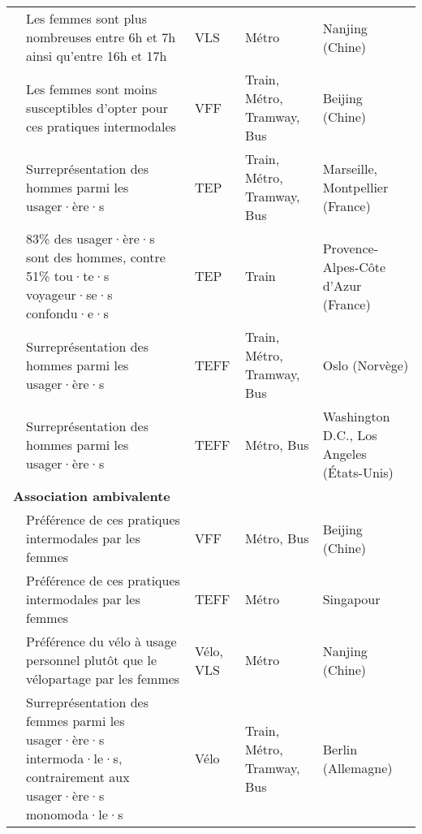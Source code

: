 \begin{longtable}{p{3cm}p{4cm}p{1.5cm}p{1.8cm}p{2.3cm}}
    \small{\textcite{ma_understanding_2018}}\index{Ma, Xinwei|pagebf} & \small{Les femmes sont plus nombreuses entre 6h et 7h ainsi qu'entre 16h et 17h} & \small{VLS} & \small{Métro} & \small{Nanjing (Chine)}\\
    \small{\textcite{fan_how_2019}}\index{Fan, Aihua|pagebf} & \small{Les femmes sont moins susceptibles d'opter pour ces pratiques intermodales} & \small{VFF} & \small{Train, Métro, Tramway, Bus} & \small{Beijing (Chine)}\\
    \small{\textcite{pages_les_2021}}\index{Pages, Thibaud|pagebf} & \small{Surreprésentation des hommes parmi les usager·ère·s} & \small{TEP} & \small{Train, Métro, Tramway, Bus} & \small{Marseille, Montpellier (France)}\\
    \small{\textcite{moinse_intermodal_2022}}\index{Moinse, Dylan|pagebf} & \small{83\% des usager·ère·s sont des hommes, contre 51\% tou·te·s voyageur·se·s confondu·e·s} & \small{TEP} & \small{Train} & \small{Provence-Alpes-Côte d'Azur (France)}\\
    \small{\textcite{fearnley_patterns_2020}}\index{Fearnley, Nils|pagebf} & \small{Surreprésentation des hommes parmi les usager·ère·s} & \small{TEFF} & \small{Train, Métro, Tramway, Bus} & \small{Oslo (Norvège)}\\
    \small{\textcite{yan_evaluating_2023}}\index{Yan, Xiang|pagebf} & \small{Surreprésentation des hommes parmi les usager·ère·s} & \small{TEFF} & \small{Métro, Bus} & \small{Washington D.C., Los Angeles (États-Unis)}\\
    \hline
\multicolumn{5}{l}{\textbf{Association ambivalente}}\\
    \small{\textcite{guo_exploring_2023}}\index{Guo, Dongbo|pagebf} & \small{Préférence de ces pratiques intermodales par les femmes} & \small{VFF} & \small{Métro, Bus} & \small{Beijing (Chine)}\\
    \small{\textcite{cao_e-scooter_2021}}\index{Cao, Zhejing|pagebf} & \small{Préférence de ces pratiques intermodales par les femmes} & \small{TEFF} & \small{Métro} & \small{Singapour}\\
    \small{\textcite{ji_public_2017}}\index{Ji, Yanjie|pagebf} & \small{Préférence du vélo à usage personnel plutôt que le vélopartage par les femmes} & \small{Vélo, VLS} & \small{Métro} & \small{Nanjing (Chine)}\\
    \small{\textcite{oostendorp_combining_2018}}\index{Oostendorp, Rebekka|pagebf} & \small{Surreprésentation des femmes parmi les usager·ère·s intermoda·le·s, contrairement aux usager·ère·s monomoda·le·s} & \small{Vélo} & \small{Train, Métro, Tramway, Bus} & \small{Berlin (Allemagne)}\\

\end{longtable}
